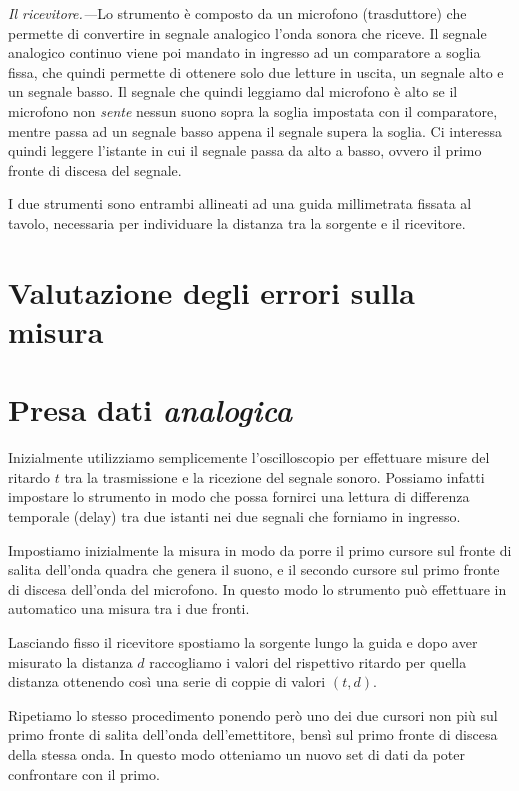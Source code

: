 \documentclass[
    rmp,
    reprint, 
    superscriptaddress, 
    altaffilletter, 
    amsmath, 
    amssymb, 
    a4paper,
    varvw]{revtex4-2}
\begin{document}
\textit{Il ricevitore.---}Lo strumento è composto da un microfono (trasduttore) che permette di convertire in segnale analogico l'onda sonora che riceve. Il segnale analogico continuo viene poi mandato in ingresso ad un comparatore a soglia fissa\iffalse(automaticamente impostata ad un valore di \SI{00}{\volt})\fi, che quindi permette di ottenere solo due letture in uscita, un segnale alto e un segnale basso. Il segnale che quindi leggiamo dal microfono è alto se il microfono non \emph{sente} nessun suono sopra la soglia impostata con il comparatore, mentre passa ad un segnale basso appena il segnale supera la soglia. Ci interessa quindi leggere l'istante in cui il segnale passa da alto a basso, ovvero il primo fronte di discesa del segnale. 

I due strumenti sono entrambi allineati ad una guida millimetrata fissata al tavolo, necessaria per individuare la distanza tra la sorgente e il ricevitore. 

\section{Valutazione degli errori sulla misura}

\section{Presa dati \emph{analogica}}

Inizialmente utilizziamo semplicemente l'oscilloscopio per effettuare misure del ritardo $t$ tra la trasmissione e la ricezione del segnale sonoro. Possiamo infatti impostare lo strumento in modo che possa fornirci una lettura di differenza temporale (delay) tra due istanti nei due segnali che forniamo in ingresso. 

Impostiamo inizialmente la misura in modo da porre il primo cursore sul fronte di salita dell'onda quadra che genera il suono, e il secondo cursore sul primo fronte di discesa dell'onda del microfono. In questo modo lo strumento può effettuare in automatico una misura tra i due fronti. 

Lasciando fisso il ricevitore spostiamo la sorgente lungo la guida e dopo aver misurato la distanza $d$ raccogliamo i valori del rispettivo ritardo per quella distanza ottenendo così una serie di coppie di valori $(t,d)$.

Ripetiamo lo stesso procedimento ponendo però uno dei due cursori non più sul primo fronte di salita dell'onda dell'emettitore, bensì sul primo fronte di discesa della stessa onda. In questo modo otteniamo un nuovo set di dati da poter confrontare con il primo. 
\end{document}
